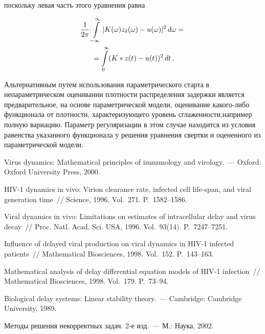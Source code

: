 \begin{multicols}{2}
\noindent
поскольку левая часть этого уравнения равна

\noindent
\begin{multline*}
\displaystyle\frac{\displaystyle 1\mathstrut}{\displaystyle 2\pi\mathstrut}\int\limits_{-\infty}^\infty
|K(\omega)z_\delta(\omega)-u(\omega)|^2\,d\omega={}\\
{}=
\int\limits_0^\infty(K\ast z(t)-u(t))^2\,dt\,.
\end{multline*}

Альтернативным путем использования па\-ра\-мет\-ри\-че\-ско\-го старта в непараметрическом
оценивании плотности распределения задержки является предварительное, на основе
параметрической модели, оценивание какого-либо функционала от плотности,
характеризующего уровень сглаженности,\linebreak например полную вариацию.
Параметр регуляризации в этом случае находится из условия равенства указанного
функционала у решения уравнения свертки и оцененного из параметрической
модели.

{\small\frenchspacing
{%
\begin{thebibliography}{9}

Virus dynamics: Mathematical
principles of immunology and virology.~--- Oxford: Oxford University Press,
 2000.

HIV-1 dynamics in vivo: Virion clearance rate,
infected cell life-span, and viral generation time~// Science,
1996. Vol.~271. P.~1582--1586.

Viral dynamics in vivo: Limitations on estimates of
intracellular delay and virus decay~// Proc. Natl. Acad. Sci. USA,
1996. Vol.~93(14). P.~7247--7251.

Influence of delayed viral production on viral dynamics in HIV-1
infected patients~// Mathematical Biosciences, 1998. Vol.~152. P.~143--163.

Mathematical analysis of
delay differential equation models of HIV-1 infection~//
Mathematical Biosciences, 1998. Vol.~179. P.~73--94.

Biological delay systems: Linear stability
theory.~--- Cambridge: Cambridge University, 1989.

\label{end\stat}

Методы решения некорректных
задач. 2-е изд.~--- М.: Наука, 2002.
\end{thebibliography}

} 
}
\end{multicols}